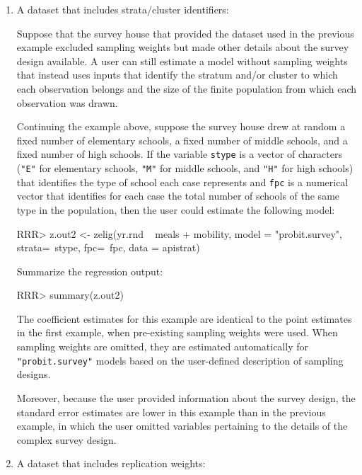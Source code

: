 \begin{enumerate}
\item  A dataset that includes strata/cluster identifiers:

Suppose that the survey house that provided the dataset used in the
previous example excluded sampling weights but made other details
about the survey design available.  A user can still estimate a model
without sampling weights that instead uses inputs that identify the
stratum and/or cluster to which each observation belongs and the
size of the finite population from which each observation was drawn.

Continuing the example above, suppose the survey house drew at
random a fixed number of elementary schools, a fixed number of
middle schools, and a fixed number of high schools. If the variable
{\tt stype} is a vector of characters ({\tt "E"} for elementary
schools, {\tt "M"} for middle schools, and {\tt "H"} for high schools)
that identifies the type of school each case
represents and {\tt fpc} is a numerical vector that identifies for
each case the total number of schools of the same type in the
population, then the user could estimate the following model:

\begin{Schunk}
\begin{Sinput}
RRR> z.out2 <- zelig(yr.rnd ~ meals + mobility, model = "probit.survey", strata=~stype, fpc=~fpc, data = apistrat)
\end{Sinput}
\end{Schunk}
Summarize the regression output:
\begin{Schunk}
\begin{Sinput}
RRR> summary(z.out2) 
\end{Sinput}
\end{Schunk}
The coefficient estimates for this example are
identical to the point estimates in the first example, when
pre-existing sampling weights were used.  When sampling weights are
omitted, they are estimated automatically for {\tt "probit.survey"}
models based on the user-defined description of sampling designs. 

Moreover, because the user provided information about the survey
design, the standard error estimates are lower in this example than
in the previous example, in which the user omitted variables pertaining
to the details of the complex survey design.

\item A dataset that includes replication weights:


\end{enumerate}

